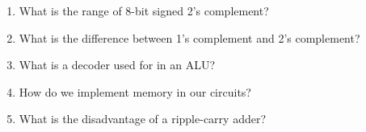 \documentclass[10pt]{article}
\begin{document}
\begin{itemize}
\begin{enumerate}
\item What is the range of 8-bit signed 2's complement?

\item What is the difference between 1's complement and 2's complement?

\item What is a decoder used for in an ALU?

\item How do we implement memory in our circuits?

\item What is the disadvantage of a ripple-carry adder?

\end{enumerate}

\end{itemize}
\end{document}
